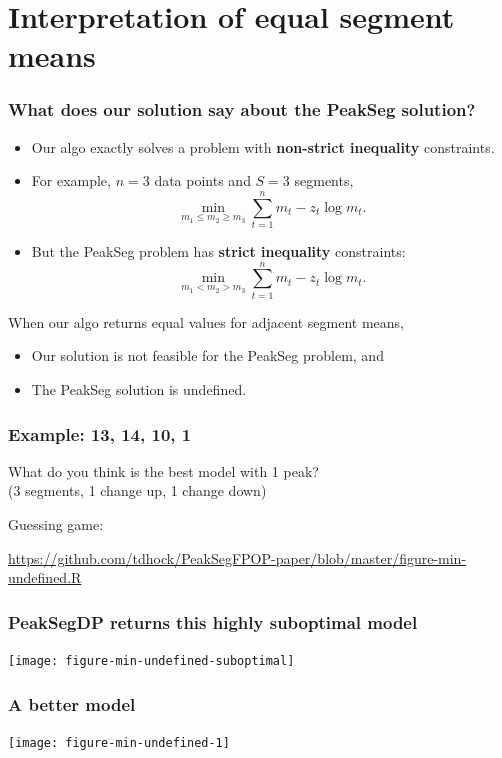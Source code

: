 \documentclass{beamer}
\begin{document}
\section*{Interpretation of equal segment means}

\begin{frame}
  \frametitle{What does our solution say about the PeakSeg solution?}
  \begin{itemize}
  \item Our algo exactly solves a problem with \textbf{non-strict
      inequality} constraints.
  \item For example, $n=3$ data points and $S=3$ segments,
    \begin{equation*}
      \min_{m_1\leq m_2\geq m_3}
      \sum_{t=1}^n m_t - z_t\log m_t.
    \end{equation*}
  \item But the PeakSeg problem has \textbf{strict inequality}
    constraints:
    \begin{equation*}
      \min_{m_1<m_2 >m_3}
      \sum_{t=1}^n m_t - z_t\log m_t.
    \end{equation*}
  \end{itemize}
  When our algo returns equal values for adjacent segment means,
  \begin{itemize}
  \item Our solution is not feasible for the PeakSeg problem, and
  \item The PeakSeg solution is undefined.
  \end{itemize}
\end{frame}


\begin{frame}
  \frametitle{Example: 13, 14, 10, 1}
  What do you think is the best model with 1 peak?\\
  (3 segments, 1 change up, 1 change down)
  
  \vskip 1cm

  Guessing game:

  \url{https://github.com/tdhock/PeakSegFPOP-paper/blob/master/figure-min-undefined.R} 
\end{frame}

\begin{frame}
  \frametitle{PeakSegDP returns this highly suboptimal model}
  \texttt{[image: figure-min-undefined-suboptimal]}
\end{frame}

\begin{frame}
  \frametitle{A better model}
  \texttt{[image: figure-min-undefined-1]}
\end{frame}
\end{document}
